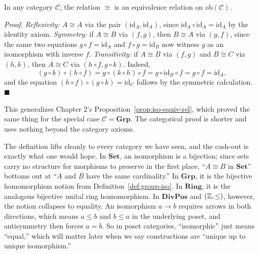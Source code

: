 \begin{proposition}\label{prop:iso-equiv-cat}

    In any category $\mathcal{C}$, the relation $\cong$ is an equivalence relation
on $\mathrm{ob}(\mathcal{C})$.

\noindent \textit{Proof.} \textit{Reflexivity:} $A \cong A$ via the pair
$(\mathrm{id}_A, \mathrm{id}_A)$, since
$\mathrm{id}_A \circ \mathrm{id}_A = \mathrm{id}_A$ by the identity axiom.
\textit{Symmetry:} if $A \cong B$ via $(f, g)$, then $B \cong A$ via $(g, f)$,
since the same two equations $g \circ f = \mathrm{id}_A$ and
$f \circ g = \mathrm{id}_B$ now witness $g$ as an isomorphism with inverse $f$.
\textit{Transitivity:} if $A \cong B$ via $(f, g)$ and $B \cong C$ via $(h, k)$,
then $A \cong C$ via $(h \circ f, g \circ k)$. Indeed,
\[
    (g \circ k) \circ (h \circ f) = g \circ (k \circ h) \circ f
    = g \circ \mathrm{id}_B \circ f = g \circ f = \mathrm{id}_A,
\]
and the equation $(h \circ f) \circ (g \circ k) = \mathrm{id}_C$ follows by the
symmetric calculation. $\blacksquare$
\end{proposition}

\noindent This generalizes Chapter 2's Proposition~\ref{prop:iso-equiv-rel}, which
proved the same thing for the special case $\mathcal{C} = \mathbf{Grp}$. The
categorical proof is shorter and uses nothing beyond the category axioms.

\noindent The definition lifts cleanly to every category we have seen, and the cash-out
is exactly what one would hope. In $\mathbf{Set}$, an isomorphism is a bijection;
since sets carry no structure for morphisms to preserve in the first place,
``$A \cong B$ in $\mathbf{Set}$'' bottoms out at ``$A$ and $B$ have the same
cardinality.'' In $\mathbf{Grp}$, it is the bijective homomorphism notion from
Definition~\ref{def:group-iso}. In $\mathbf{Ring}$, it is the analogous bijective
unital ring homomorphism. In $\mathbf{DivPos}$ and $({\mathbb{Z}}, \leq)$, however, the
notion collapses to equality. An isomorphism $a \to b$ requires arrows in both
directions, which means $a \leq b$ and $b \leq a$ in the underlying poset, and
antisymmetry then forces $a = b$. So in poset categories, ``isomorphic'' just
means ``equal,'' which will matter later when we say constructions are ``unique
up to unique isomorphism.''

